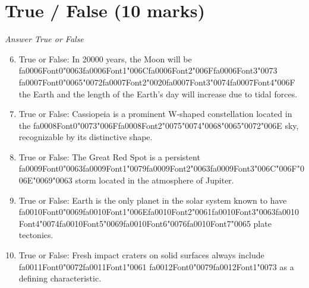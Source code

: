 \documentclass[12pt]{article}
\begin{document}
\section*{True / False (10 marks)}
\textit{Answer True or False}
\begin{enumerate}[label=\arabic*.]
\setcounter{enumi}{5}
\item True or False: In 20000 years, the Moon will be {\csname fa0006Font0\endcsname\char"0063}{\csname fa0006Font1\endcsname\char"006C}{\csname fa0006Font2\endcsname\char"006F}{\csname fa0006Font3\endcsname\char"0073} {\csname fa0007Font0\endcsname\char"0065}{\char"0072}{\csname fa0007Font2\endcsname\char"0020}{\csname fa0007Font3\endcsname\char"0074}{\csname fa0007Font4\endcsname\char"006F} the Earth and the length of the Earth's day will increase due to tidal forces.
\item True or False: Cassiopeia is a prominent W-shaped constellation located in the {\csname fa0008Font0\endcsname\char"0073}{\char"006F}{\csname fa0008Font2\endcsname\char"0075}{\char"0074}{\char"0068}{\char"0065}{\char"0072}{\char"006E} sky, recognizable by its distinctive shape.
\item True or False: The Great Red Spot is a persistent {\csname fa0009Font0\endcsname\char"0063}{\csname fa0009Font1\endcsname\char"0079}{\csname fa0009Font2\endcsname\char"0063}{\csname fa0009Font3\endcsname\char"006C}{\char"006F}{\char"006E}{\char"0069}{\char"0063} storm located in the atmosphere of Jupiter.
\item True or False: Earth is the only planet in the solar system known to have {\csname fa0010Font0\endcsname\char"0069}{\csname fa0010Font1\endcsname\char"006E}{\csname fa0010Font2\endcsname\char"0061}{\csname fa0010Font3\endcsname\char"0063}{\csname fa0010Font4\endcsname\char"0074}{\csname fa0010Font5\endcsname\char"0069}{\csname fa0010Font6\endcsname\char"0076}{\csname fa0010Font7\endcsname\char"0065} plate tectonics.
\item True or False: Fresh impact craters on solid surfaces always include {\csname fa0011Font0\endcsname\char"0072}{\csname fa0011Font1\endcsname\char"0061} {\csname fa0012Font0\endcsname\char"0079}{\csname fa0012Font1\endcsname\char"0073} as a defining characteristic.
\end{enumerate}
\end{document}
